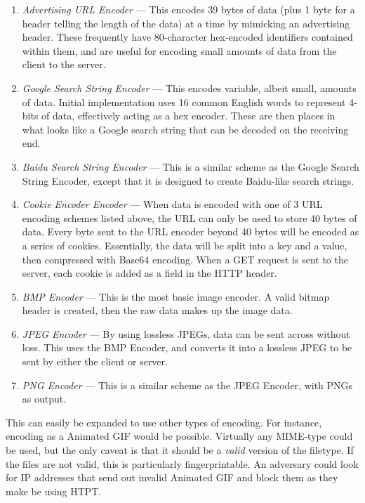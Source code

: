 \begin{enumerate}
  \item \emph{Advertising URL Encoder} --- This encodes 39 bytes of data (plus 1 byte for a header telling the length of the data) at a time by mimicking an advertising header. These frequently have 80-character hex-encoded identifiers contained within them, and are useful for encoding small amounts of data from the client to the server.
  \item \emph{Google Search String Encoder} --- This encodes variable, albeit small, amounts of data. Initial implementation uses 16 common English words to represent 4-bits of data, effectively acting as a hex encoder. These are then places in what looks like a Google search string that can be decoded on the receiving end.
  \item \emph{Baidu Search String Encoder} --- This is a similar scheme as the Google Search String Encoder, except that it is designed to create Baidu-like search strings.
  \item \emph{Cookie Encoder Encoder} --- When data is encoded with one of 3 URL encoding schemes listed above, the URL can only be used to store 40 bytes of data. Every byte sent to the URL encoder beyond 40 bytes will be encoded as a series of cookies. Essentially, the data will be split into a key and a value, then compressed with Base64 encoding. When a GET request is sent to the server, each cookie is added as a field in the HTTP header.
  \item \emph{BMP Encoder} --- This is the most basic image encoder. A valid bitmap header is created, then the raw data makes up the image data.
  \item \emph{JPEG Encoder} --- By using lossless JPEGs, data can be sent across without loss. This uses the BMP Encoder, and converts it into a lossless JPEG to be sent by either the client or server.
  \item \emph{PNG Encoder} --- This is a similar scheme as the JPEG Encoder, with PNGs as output.
\end{enumerate}

This can easily be expanded to use other types of encoding. For instance, encoding as a Animated GIF would be possible. Virtually any MIME-type could be used, but the only caveat is that it should be a \emph{valid} version of the filetype. If the files are not valid, this is particularly fingerprintable. An adversary could look for IP addresses that send out invalid Animated GIF and block them as they make be using HTPT.

